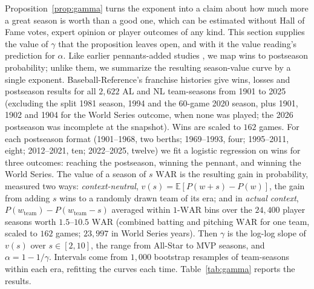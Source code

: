 \documentclass[11pt,letterpaper]{article}
\theoremstyle{plain}
\theoremstyle{definition}
\theoremstyle{remark}
\newcommand{\WAR}{\mathrm{WAR}}
\newcommand{\E}{\mathbb{E}}
\begin{document}
Proposition~\ref{prop:gamma} turns the exponent into a claim about how much more a great season is worth than a good one, which can be estimated without Hall of Fame votes, expert opinion or player outcomes of any kind. This section supplies the value of $\gamma$ that the proposition leaves open, and with it the value reading's prediction for $\alpha$. Like earlier pennants-added studies \cite{wolverton2002,levitt2005,gassko2007}, we map wins to postseason probability; unlike them, we summarize the resulting season-value curve by a single exponent. Baseball-Reference's franchise histories \cite{bbrefteams} give wins, losses and postseason results for all $2{,}622$ AL and NL team-seasons from 1901 to 2025 (excluding the split 1981 season, 1994 and the 60-game 2020 season, plus 1901, 1902 and 1904 for the World Series outcome, when none was played; the 2026 postseason was incomplete at the snapshot). Wins are scaled to $162$ games. For each postseason format (1901--1968, two berths; 1969--1993, four; 1995--2011, eight; 2012--2021, ten; 2022--2025, twelve) we fit a logistic regression on wins for three outcomes: reaching the postseason, winning the pennant, and winning the World Series. The value of a season of $s$ $\WAR$ is the resulting gain in probability, measured two ways: \emph{context-neutral}, $v(s) = \E[P(w + s) - P(w)]$, the gain from adding $s$ wins to a randomly drawn team of its era; and in \emph{actual context}, $P(w_{\mathrm{team}}) - P(w_{\mathrm{team}} - s)$ averaged within $1$-$\WAR$ bins over the $24{,}400$ player seasons worth $1.5$--$10.5$ $\WAR$ (combined batting and pitching $\WAR$ for one team, scaled to $162$ games; $23{,}997$ in World Series years). Then $\gamma$ is the log-log slope of $v(s)$ over $s \in [2, 10]$, the range from All-Star to MVP seasons, and $\alpha = 1 - 1/\gamma$. Intervals come from $1{,}000$ bootstrap resamples of team-seasons within each era, refitting the curves each time. Table~\ref{tab:gamma} reports the results.
\end{document}
